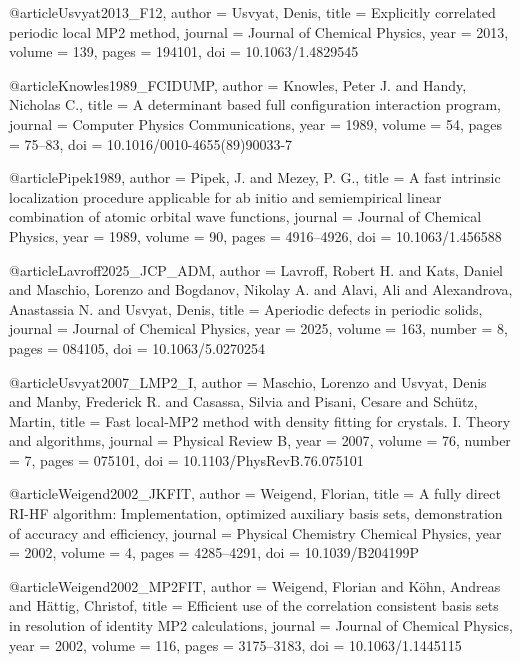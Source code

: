 @article{Usvyat2013_F12,
  author = {Usvyat, Denis},
  title = {Explicitly correlated periodic local MP2 method},
  journal = {Journal of Chemical Physics},
  year = {2013},
  volume = {139},
  pages = {194101},
  doi = {10.1063/1.4829545}
}

@article{Knowles1989_FCIDUMP,
  author = {Knowles, Peter J. and Handy, Nicholas C.},
  title = {A determinant based full configuration interaction program},
  journal = {Computer Physics Communications},
  year = {1989},
  volume = {54},
  pages = {75--83},
  doi = {10.1016/0010-4655(89)90033-7}
}

@article{Pipek1989,
  author = {Pipek, J. and Mezey, P. G.},
  title = {A fast intrinsic localization procedure applicable for ab initio and semiempirical linear combination of atomic orbital wave functions},
  journal = {Journal of Chemical Physics},
  year = {1989},
  volume = {90},
  pages = {4916--4926},
  doi = {10.1063/1.456588}
}


@article{Lavroff2025_JCP_ADM,
  author  = {Lavroff, Robert H. and Kats, Daniel and Maschio, Lorenzo and
             Bogdanov, Nikolay A. and Alavi, Ali and Alexandrova, Anastassia N.
             and Usvyat, Denis},
  title   = {Aperiodic defects in periodic solids},
  journal = {Journal of Chemical Physics},
  year    = {2025},
  volume  = {163},
  number  = {8},
  pages   = {084105},
  doi     = {10.1063/5.0270254}
}


@article{Usvyat2007_LMP2_I,
  author  = {Maschio, Lorenzo and Usvyat, Denis and Manby, Frederick R. and Casassa, Silvia and Pisani, Cesare and Sch{\"u}tz, Martin},
  title   = {Fast local‑MP2 method with density fitting for crystals. I. Theory and algorithms},
  journal = {Physical Review B},
  year    = {2007},
  volume  = {76},
  number  = {7},
  pages   = {075101},
  doi     = {10.1103/PhysRevB.76.075101}
}

@article{Weigend2002_JKFIT,
  author  = {Weigend, Florian},
  title   = {A fully direct RI-HF algorithm: Implementation, optimized auxiliary basis sets, demonstration of accuracy and efficiency},
  journal = {Physical Chemistry Chemical Physics},
  year    = {2002},
  volume  = {4},
  pages   = {4285--4291},
  doi     = {10.1039/B204199P}
}


@article{Weigend2002_MP2FIT,
  author  = {Weigend, Florian and K{\"o}hn, Andreas and H{\"a}ttig, Christof},
  title   = {Efficient use of the correlation consistent basis sets in resolution of identity MP2 calculations},
  journal = {Journal of Chemical Physics},
  year    = {2002},
  volume  = {116},
  pages   = {3175--3183},
  doi     = {10.1063/1.1445115}
}


